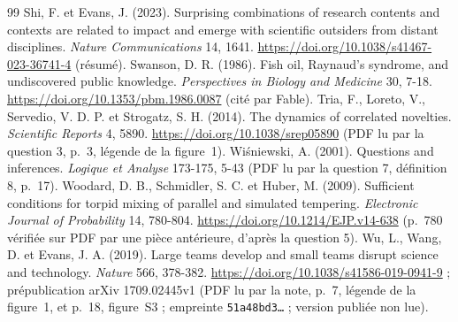\documentclass[11pt,a4paper]{article}
\theoremstyle{definition}
\theoremstyle{plain}
\begin{document}
\begin{thebibliography}{99}
 Shi, F. et Evans, J. (2023). Surprising combinations of research contents and
contexts are related to impact and emerge with scientific outsiders from distant disciplines.
\emph{Nature Communications} 14, 1641. \url{https://doi.org/10.1038/s41467-023-36741-4} (résumé).
 Swanson, D. R. (1986). Fish oil, Raynaud's syndrome, and undiscovered public
knowledge. \emph{Perspectives in Biology and Medicine} 30, 7-18.
\url{https://doi.org/10.1353/pbm.1986.0087} (cité par Fable).
 Tria, F., Loreto, V., Servedio, V. D. P. et Strogatz, S. H. (2014). The dynamics of
correlated novelties. \emph{Scientific Reports} 4, 5890. \url{https://doi.org/10.1038/srep05890} (PDF lu
par la question 3, p.~3, légende de la figure~1).
 Wiśniewski, A. (2001). Questions and inferences. \emph{Logique et Analyse}
173-175, 5-43 (PDF lu par la question 7, définition 8, p.~17).
 Woodard, D. B., Schmidler, S. C. et Huber, M. (2009). Sufficient conditions for
torpid mixing of parallel and simulated tempering. \emph{Electronic Journal of Probability} 14,
780-804. \url{https://doi.org/10.1214/EJP.v14-638} (p.~780 vérifiée sur PDF par une pièce antérieure,
d'après la question 5).
 Wu, L., Wang, D. et Evans, J. A. (2019). Large teams develop and small teams disrupt
science and technology. \emph{Nature} 566, 378-382. \url{https://doi.org/10.1038/s41586-019-0941-9} ;
prépublication arXiv 1709.02445v1 (PDF lu par la note, p.~7, légende de la figure~1, et p.~18,
figure~S3 ; empreinte \texttt{51a48bd3…} ; version publiée non lue).

\end{thebibliography}
\end{document}
